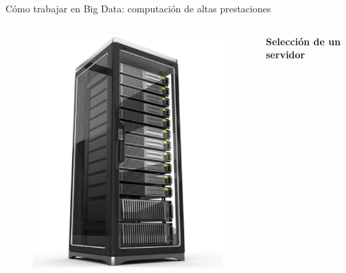 \begin{frame}{\large Cómo trabajar en Big Data: computación de altas prestaciones}
\begin{columns}
				\begin{figure}
					\includegraphics[width=\textwidth]{./Images/cluster.jpg}
				\end{figure}
				\fontsize{9}{8}\selectfont	
				\textbf{Selección de un servidor}

			\end{columns}
			
		\end{frame}
